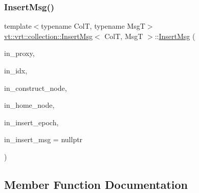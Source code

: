 \mbox{\label{structvt_1_1vrt_1_1collection_1_1_insert_msg_a2df48d0777f98f268beee283f1bbd840}} 
\subsubsection{\texorpdfstring{Insert\+Msg()}{InsertMsg()}\hspace{0.1cm}{\footnotesize\ttfamily [2/2]}}
{\footnotesize\ttfamily template$<$typename ColT, typename MsgT$>$ \\
\hyperlink{structvt_1_1vrt_1_1collection_1_1_insert_msg}{vt\+::vrt\+::collection\+::\+Insert\+Msg}$<$ ColT, MsgT $>$\+::\hyperlink{structvt_1_1vrt_1_1collection_1_1_insert_msg}{Insert\+Msg} (\begin{DoxyParamCaption}\item[{\hyperlink{structvt_1_1vrt_1_1collection_1_1_collection_proxy}{Collection\+Proxy}$<$ ColT $>$}]{in\+\_\+proxy,  }\item[{\hyperlink{structvt_1_1vrt_1_1collection_1_1_insert_msg_a6d0f0e849ba09859a0cda3e4785de16b}{Index\+Type}}]{in\+\_\+idx,  }\item[{\hyperlink{namespacevt_a866da9d0efc19c0a1ce79e9e492f47e2}{Node\+Type}}]{in\+\_\+construct\+\_\+node,  }\item[{\hyperlink{namespacevt_a866da9d0efc19c0a1ce79e9e492f47e2}{Node\+Type}}]{in\+\_\+home\+\_\+node,  }\item[{\hyperlink{namespacevt_a81d11b28122d43bf9834577e4a06440f}{Epoch\+Type}}]{in\+\_\+insert\+\_\+epoch,  }\item[{\hyperlink{namespacevt_ab2b3d506ec8e8d1540aede826d84a239}{Msg\+Shared\+Ptr}$<$ MsgT $>$}]{in\+\_\+insert\+\_\+msg = {\ttfamily nullptr} }\end{DoxyParamCaption})\hspace{0.3cm}{\ttfamily [inline]}}



\subsection{Member Function Documentation}
\mbox{\label{structvt_1_1vrt_1_1collection_1_1_insert_msg_ac55e25383969b7d021b68e6062974a6d}} 
